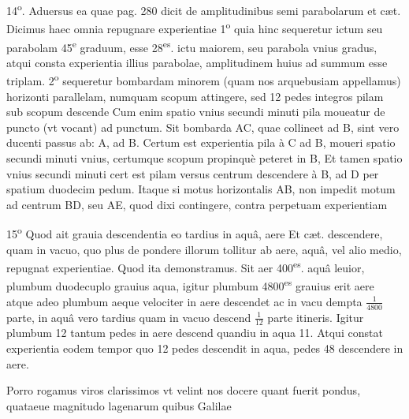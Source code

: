 \documentclass[11pt,a4paper]{article}
\begin{document}
14\textsuperscript{o}. Aduersus ea quae pag. 280 dicit de amplitudinibus semi\ill{} parabolarum et cæt. Dicimus haec omnia repugnare experientiae 1\textsuperscript{o} quia hinc sequeretur ictum seu parabolam 45\textsuperscript{e} graduum, esse 28\textsuperscript{es}. ictu maiorem, seu parabola vnius gradus, atqui consta experientia illius parabolae, amplitudinem huius ad summum esse triplam. 2\textsuperscript{o} sequeretur bombardam minorem (quam nos arquebusiam appellamus) horizonti parallelam, numquam scopum attingere, sed 12 pedes integros pilam sub scopum descende Cum enim spatio vnius secundi minuti pila moueatur de puncto (vt vocant) ad punctum. Sit bombarda AC, quae collineet ad B, sint vero ducenti passus ab: A, ad B. Certum est experientia pila à C ad B, moueri spatio secundi minuti vnius, certumque scopum propinquè peteret in B, Et tamen spatio vnius secundi minuti cert est pilam versus centrum descendere à B, ad D per spatium duodecim pedum. Itaque si motus horizontalis AB, non impedit motum ad centrum BD, seu AE, quod dixi contingere, contra perpetuam experientiam

15\textsuperscript{o} Quod ait grauia descendentia eo tardius in aquâ, aere Et cæt. descendere, quam in vacuo, quo plus de pondere illorum tollitur ab aere, aquâ, vel alio medio, repugnat experientiae. Quod ita demonstramus. Sit aer 400\textsuperscript{es}. aquâ leuior, plumbum duodecuplo grauius aqua, igitur plumbum 4800\textsuperscript{es} grauius erit aere atque adeo plumbum aeque velociter in aere descendet ac in vacu dempta $\frac{1}{4800}$ parte, in aquâ vero tardius quam in vacuo descend $\frac{1}{12}$ parte itineris. Igitur plumbum 12 tantum pedes in aere descend\ill{} quandiu in aqua 11. Atqui constat experientia eodem tempor quo 12 pedes descendit in aqua, pedes 48 descendere in aere.

Porro rogamus viros clarissimos vt velint nos docere quant\ill{} fuerit pondus, quataeue magnitudo lagenarum quibus Galilae


\end{document}
